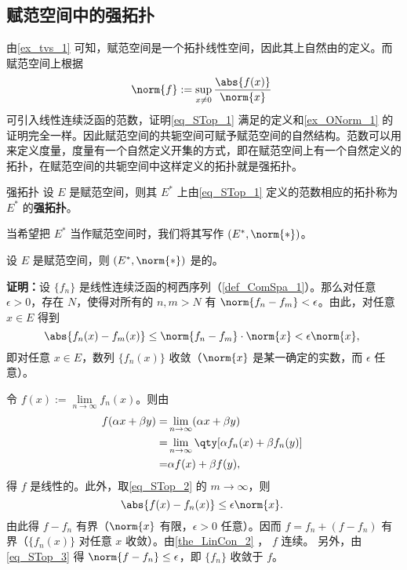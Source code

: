 
\subsection{赋范空间中的强拓扑}

由\autoref{ex_tvs_1} 可知，赋范空间是一个拓扑线性空间，因此其上自然由的定义。而赋范空间上根据
\begin{equation}\label{eq_STop_1}
\norm{f}:=\sup_{x\neq0}\frac{\abs{f(x)}}{\norm{x}}~
\end{equation}
可引入线性连续泛函的范数，证明\autoref{eq_STop_1} 满足的定义和\autoref{ex_ONorm_1} 的证明完全一样。因此赋范空间的共轭空间可赋予赋范空间的自然结构。范数可以用来定义度量，度量有一个自然定义开集的方式，即在赋范空间上有一个自然定义的拓扑，在赋范空间的共轭空间中这样定义的拓扑就是强拓扑。
\begin{definition}{强拓扑}
设 $E$ 是赋范空间，则其 $E^*$ 上由\autoref{eq_STop_1} 定义的范数相应的拓扑称为 $E^*$ 的\textbf{强拓扑}。
\end{definition}

当希望把 $E^*$ 当作赋范空间时，我们将其写作 $(E^*,\norm{*})$。

\begin{theorem}{}
设 $E$ 是赋范空间，则 $(E^*,\norm{*})$ 是的。
\end{theorem}

\textbf{证明：}设 $\{f_n\}$ 是线性连续泛函的柯西序列（\autoref{def_ComSpa_1}）。那么对任意 $\epsilon>0$，存在 $N$，使得对所有的 $n,m>N$ 有 $\norm{f_n-f_m}<\epsilon$。由此，对任意 $x\in E$ 得到
\begin{equation}\label{eq_STop_2}
\abs{f_n(x)-f_m(x)}\leq\norm{f_n-f_m}\cdot\norm{x}<\epsilon\norm{x},~
\end{equation}
即对任意 $x\in E$，数列 $\{f_n(x)\}$ 收敛（$\norm{x}$ 是某一确定的实数，而 $\epsilon$ 任意）。

令 $f(x):=\lim\limits_{n\rightarrow\infty}f_n(x)$。则由
\begin{equation}
\begin{aligned}
f(\alpha x+\beta y)=&\lim_{n\rightarrow\infty}(\alpha x+\beta y)\\
=&\lim_{n\rightarrow\infty}\qty[\alpha f_n(x)+\beta f_n(y)]\\
=&\alpha f(x)+\beta f(y),
\end{aligned}~
\end{equation}
得 $f$ 是线性的。此外，取\autoref{eq_STop_2} 的 $m\rightarrow\infty$，则 
\begin{equation}\label{eq_STop_3}
\abs{f(x)-f_n(x)}\leq \epsilon\norm{x}.~
\end{equation}
由此得 $f-f_n$ 有界（$\norm{x}$ 有限，$\epsilon>0$ 任意）。因而 $f=f_n+(f-f_n)$ 有界（$\{f_n(x)\}$ 对任意 $x$ 收敛）。由\autoref{the_LinCon_2} ， $f$ 连续。 另外，由\autoref{eq_STop_3} 得 $\norm{f-f_n}\leq\epsilon$，即 $\{f_n\}$ 收敛于 $f$。


